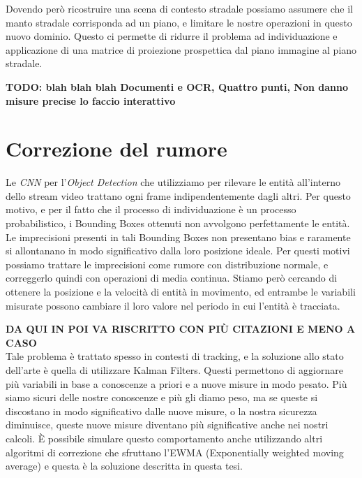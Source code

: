 Dovendo però ricostruire una scena di contesto stradale possiamo assumere che il manto stradale corrisponda ad un piano, e limitare le nostre operazioni in questo nuovo dominio.
Questo ci permette di ridurre il problema ad individuazione e applicazione di una matrice di proiezione prospettica dal piano immagine al piano stradale.

\textbf{TODO: blah blah blah Documenti e OCR, Quattro punti, Non danno misure precise lo faccio interattivo}


\section{Correzione del rumore}
\label{sec:funzionalita-rumore}
Le \emph{CNN} per l'\emph{Object Detection} che utilizziamo per rilevare le entità all'interno dello stream video trattano ogni frame indipendentemente dagli altri.
Per questo motivo, e per il fatto che il processo di individuazione è un processo probabilistico, i Bounding Boxes ottenuti non avvolgono perfettamente le entità.
Le imprecisioni presenti in tali Bounding Boxes non presentano bias e raramente si allontanano in modo significativo dalla loro posizione ideale.
Per questi motivi possiamo trattare le imprecisioni come rumore con distribuzione normale, e correggerlo quindi con operazioni di media continua.
Stiamo però cercando di ottenere la posizione e la velocità di entità in movimento, ed entrambe le variabili misurate possono cambiare il loro valore nel periodo in cui l'entità è tracciata.

\textbf{DA QUI IN POI VA RISCRITTO CON PIÙ CITAZIONI E MENO A CASO} \\
Tale problema è trattato spesso in contesti di tracking, e la soluzione allo stato dell'arte è quella di utilizzare Kalman Filters.
Questi permettono di aggiornare più variabili in base a conoscenze a priori e a nuove misure in modo pesato.
Più siamo sicuri delle nostre conoscenze e più gli diamo peso, ma se queste si discostano in modo significativo dalle nuove misure, o la nostra sicurezza diminuisce, queste nuove misure diventano più significative anche nei nostri calcoli.
È possibile simulare questo comportamento anche utilizzando altri algoritmi di correzione che sfruttano l'EWMA (Exponentially weighted moving average) e questa è la soluzione descritta in questa tesi.
